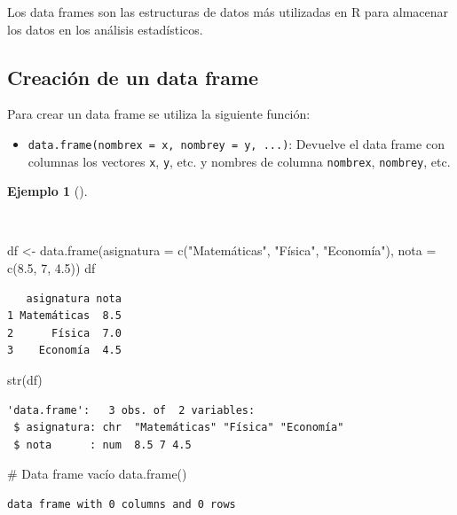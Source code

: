 \documentclass[
  a4paper,
]{scrreport}
\newenvironment{Shaded}{\begin{snugshade}}{\end{snugshade}}
\newcommand{\AttributeTok}[1]{\textcolor[rgb]{0.40,0.45,0.13}{#1}}
\newcommand{\CommentTok}[1]{\textcolor[rgb]{0.37,0.37,0.37}{#1}}
\newcommand{\DecValTok}[1]{\textcolor[rgb]{0.68,0.00,0.00}{#1}}
\newcommand{\FloatTok}[1]{\textcolor[rgb]{0.68,0.00,0.00}{#1}}
\newcommand{\FunctionTok}[1]{\textcolor[rgb]{0.28,0.35,0.67}{#1}}
\newcommand{\NormalTok}[1]{\textcolor[rgb]{0.00,0.23,0.31}{#1}}
\newcommand{\OtherTok}[1]{\textcolor[rgb]{0.00,0.23,0.31}{#1}}
\newcommand{\StringTok}[1]{\textcolor[rgb]{0.13,0.47,0.30}{#1}}
\providecommand{\tightlist}{%
  \setlength{\itemsep}{0pt}\setlength{\parskip}{0pt}}\usepackage{longtable,booktabs,array}
\theoremstyle{definition}
\theoremstyle{definition}
\newtheorem{example}{Ejemplo}[chapter]
\theoremstyle{remark}
\begin{document}
Los data frames son las estructuras de datos más utilizadas en R para
almacenar los datos en los análisis estadísticos.

\subsection{Creación de un data
frame}\label{creaciuxf3n-de-un-data-frame}

Para crear un data frame se utiliza la siguiente función:

\begin{itemize}
\tightlist
\item
  \texttt{data.frame(nombrex\ =\ x,\ nombrey\ =\ y,\ ...)}: Devuelve el
  data frame con columnas los vectores \texttt{x}, \texttt{y}, etc. y
  nombres de columna \texttt{nombrex}, \texttt{nombrey}, etc.
\end{itemize}

\begin{example}[]\protect\hypertarget{exm-creacion-data-frames}{}\label{exm-creacion-data-frames}

~

\begin{Shaded}
\begin{Highlighting}[]
\NormalTok{df }\OtherTok{\textless{}{-}} \FunctionTok{data.frame}\NormalTok{(}\AttributeTok{asignatura =} \FunctionTok{c}\NormalTok{(}\StringTok{"Matemáticas"}\NormalTok{, }\StringTok{"Física"}\NormalTok{, }\StringTok{"Economía"}\NormalTok{), }\AttributeTok{nota =} \FunctionTok{c}\NormalTok{(}\FloatTok{8.5}\NormalTok{, }\DecValTok{7}\NormalTok{, }\FloatTok{4.5}\NormalTok{))}
\NormalTok{df}
\end{Highlighting}
\end{Shaded}

\begin{verbatim}
   asignatura nota
1 Matemáticas  8.5
2      Física  7.0
3    Economía  4.5
\end{verbatim}

\begin{Shaded}
\begin{Highlighting}[]
\FunctionTok{str}\NormalTok{(df)}
\end{Highlighting}
\end{Shaded}

\begin{verbatim}
'data.frame':   3 obs. of  2 variables:
 $ asignatura: chr  "Matemáticas" "Física" "Economía"
 $ nota      : num  8.5 7 4.5
\end{verbatim}

\begin{Shaded}
\begin{Highlighting}[]
\CommentTok{\# Data frame vacío}
\FunctionTok{data.frame}\NormalTok{()}
\end{Highlighting}
\end{Shaded}

\begin{verbatim}
data frame with 0 columns and 0 rows
\end{verbatim}

\end{example}
\end{document}
